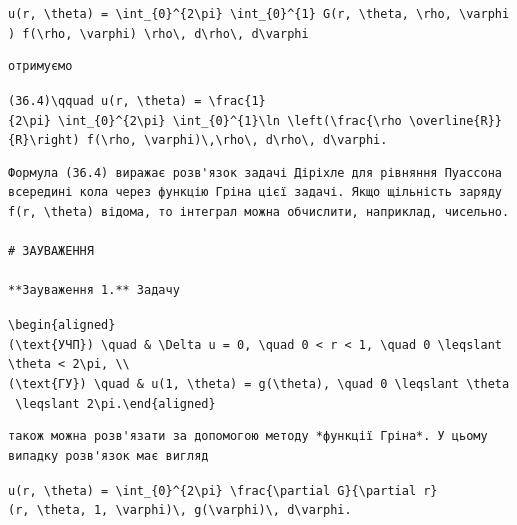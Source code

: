 \documentclass[
  ukrainian,
]{article}
\begin{document}
\texttt{u(r,\ \textbackslash{}theta)\ =\ \textbackslash{}int\_\{0\}\^{}\{2\textbackslash{}pi\}\ \textbackslash{}int\_\{0\}\^{}\{1\}\ G(r,\ \textbackslash{}theta,\ \textbackslash{}rho,\ \textbackslash{}varphi)\ f(\textbackslash{}rho,\ \textbackslash{}varphi)\ \textbackslash{}rho\textbackslash{},\ d\textbackslash{}rho\textbackslash{},\ d\textbackslash{}varphi}

\begin{verbatim}
отримуємо
\end{verbatim}

\texttt{(36.4)\textbackslash{}qquad\ u(r,\ \textbackslash{}theta)\ =\ \textbackslash{}frac\{1\}\{2\textbackslash{}pi\}\ \textbackslash{}int\_\{0\}\^{}\{2\textbackslash{}pi\}\ \textbackslash{}int\_\{0\}\^{}\{1\}\textbackslash{}ln\ \textbackslash{}left(\textbackslash{}frac\{\textbackslash{}rho\ \textbackslash{}overline\{R\}\}\{R\}\textbackslash{}right)\ f(\textbackslash{}rho,\ \textbackslash{}varphi)\textbackslash{},\textbackslash{}rho\textbackslash{},\ d\textbackslash{}rho\textbackslash{},\ d\textbackslash{}varphi.}

\begin{verbatim}
Формула (36.4) виражає розв'язок задачі Діріхле для рівняння Пуассона всередині кола через функцію Гріна цієї задачі. Якщо щільність заряду f(r, \theta) відома, то інтеграл можна обчислити, наприклад, чисельно.

# ЗАУВАЖЕННЯ

**Зауваження 1.** Задачу
\end{verbatim}

\texttt{\textbackslash{}begin\{aligned\}(\textbackslash{}text\{УЧП\})\ \textbackslash{}quad\ \&\ \textbackslash{}Delta\ u\ =\ 0,\ \textbackslash{}quad\ 0\ \textless{}\ r\ \textless{}\ 1,\ \textbackslash{}quad\ 0\ \textbackslash{}leqslant\ \textbackslash{}theta\ \textless{}\ 2\textbackslash{}pi,\ \textbackslash{}\textbackslash{}(\textbackslash{}text\{ГУ\})\ \textbackslash{}quad\ \&\ u(1,\ \textbackslash{}theta)\ =\ g(\textbackslash{}theta),\ \textbackslash{}quad\ 0\ \textbackslash{}leqslant\ \textbackslash{}theta\ \textbackslash{}leqslant\ 2\textbackslash{}pi.\textbackslash{}end\{aligned\}}

\begin{verbatim}
також можна розв'язати за допомогою методу *функції Гріна*. У цьому випадку розв'язок має вигляд
\end{verbatim}

\texttt{u(r,\ \textbackslash{}theta)\ =\ \textbackslash{}int\_\{0\}\^{}\{2\textbackslash{}pi\}\ \textbackslash{}frac\{\textbackslash{}partial\ G\}\{\textbackslash{}partial\ r\}(r,\ \textbackslash{}theta,\ 1,\ \textbackslash{}varphi)\textbackslash{},\ g(\textbackslash{}varphi)\textbackslash{},\ d\textbackslash{}varphi.}
\end{document}
